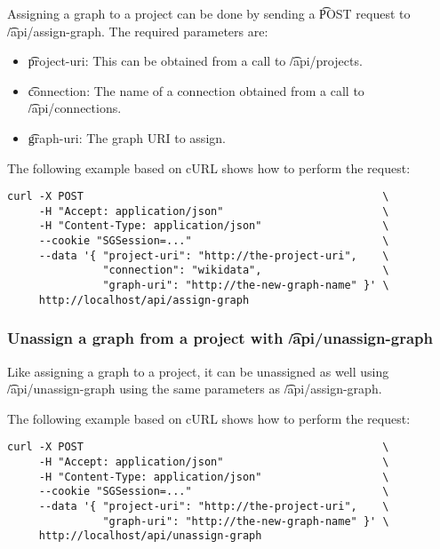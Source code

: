   Assigning a graph to a project can be done by sending a \t{POST} request
  to \t{/api/assign-graph}.  The required parameters are:

  \begin{itemize}
    \item{\t{project-uri}: This can be obtained from a call to
      \t{/api/projects}.}
    \item{\t{connection}: The name of a connection obtained from
      a call to \t{/api/connections}.}
    \item{\t{graph-uri}: The graph URI to assign.}
  \end{itemize}

  The following example based on cURL shows how to perform the request:
\begin{siderules}
\begin{verbatim}
curl -X POST                                               \
     -H "Accept: application/json"                         \
     -H "Content-Type: application/json"                   \
     --cookie "SGSession=..."                              \
     --data '{ "project-uri": "http://the-project-uri",    \
               "connection": "wikidata",                   \
               "graph-uri": "http://the-new-graph-name" }' \
     http://localhost/api/assign-graph
\end{verbatim}
\end{siderules}

\subsubsection{Unassign a graph from a project with \t{/api/unassign-graph}}

  Like assigning a graph to a project, it can be unassigned as well using
  \t{/api/unassign-graph} using the same parameters as
  \t{/api/assign-graph}.

  The following example based on cURL shows how to perform the request:
\begin{siderules}
\begin{verbatim}
curl -X POST                                               \
     -H "Accept: application/json"                         \
     -H "Content-Type: application/json"                   \
     --cookie "SGSession=..."                              \
     --data '{ "project-uri": "http://the-project-uri",    \
               "graph-uri": "http://the-new-graph-name" }' \
     http://localhost/api/unassign-graph
\end{verbatim}
\end{siderules}


